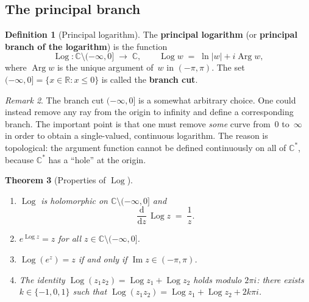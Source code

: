 \documentclass[12pt,a4paper,openany]{book}
\theoremstyle{definition}
\newtheorem{definition}{Definition}[chapter]
\theoremstyle{plain}
\newtheorem{theorem}[definition]{Theorem}
\theoremstyle{remark}
\newtheorem{remark}[definition]{Remark}
\newcommand{\C}{\mathbb{C}}
\newcommand{\R}{\mathbb{R}}
\DeclareMathOperator{\im}{Im}
\DeclareMathOperator{\Arg}{Arg}
\DeclareMathOperator{\Log}{Log}
\newcommand{\dd}{\mathrm{d}}
\newcommand{\abs}[1]{\left|#1\right|}
\begin{document}
\subsection{The principal branch}

\begin{definition}[Principal logarithm]\label{def:principal-log}
The \textbf{principal logarithm}
(or \textbf{principal branch of the logarithm}) is the function
\[
  \Log\colon \C\setminus(-\infty,0] \;\longrightarrow\; \C, \qquad
  \Log w \;=\; \ln\abs{w} + i\Arg w,
\]
where $\Arg w$ is the unique argument of~$w$ in $(-\pi,\pi)$.
The set $(-\infty,0] = \{x\in\R : x\le 0\}$ is called the
\textbf{branch cut}.
\end{definition}

\begin{remark}\label{rem:log-branch-cut}
The branch cut $(-\infty,0]$ is a somewhat arbitrary choice.  One could
instead remove any ray from the origin to infinity and define a
corresponding branch.  The important point is that one must remove
\emph{some} curve from~$0$ to~$\infty$ in order to obtain a single-valued,
continuous logarithm.  The reason is topological: the argument function
cannot be defined continuously on all of $\C^*$, because $\C^*$ has a
``hole'' at the origin.
\end{remark}

\begin{theorem}[Properties of $\Log$]\label{thm:log-properties}
\leavevmode
\begin{enumerate}[label=\textup{(\roman*)}]
  \item $\Log$ is holomorphic on $\C\setminus(-\infty,0]$ and
    \[
      \frac{\dd}{\dd z}\,\Log z \;=\; \frac{1}{z}.
    \]
  \item $e^{\Log z} = z$ for all $z\in\C\setminus(-\infty,0]$.
  \item $\Log(e^z) = z$ if and only if $\im z\in(-\pi,\pi)$.
  \item The identity $\Log(z_1 z_2) = \Log z_1 + \Log z_2$ holds
    \emph{modulo $2\pi i$}: there exists $k\in\{-1,0,1\}$ such that
    $\Log(z_1 z_2) = \Log z_1 + \Log z_2 + 2k\pi i$.
\end{enumerate}
\end{theorem}
\end{document}
